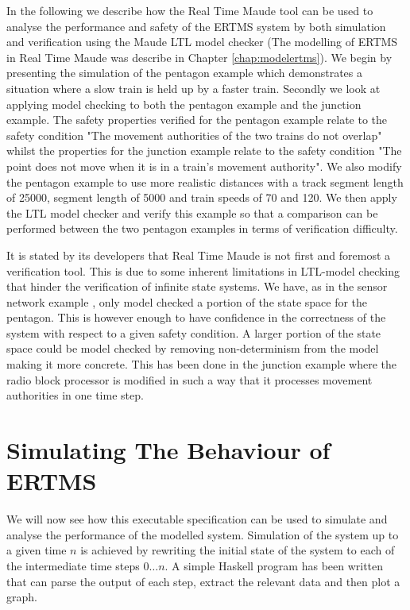 \label{chapter:verifyertms}\label{chap:verifyertms}


In the following we describe how the Real Time Maude tool can be used to analyse the performance and safety of the ERTMS system by both simulation and verification using the Maude LTL model checker (The modelling of ERTMS in Real Time Maude was describe in Chapter \ref{chap:modelertms}).  We begin by presenting the simulation of the pentagon example which demonstrates a situation where a slow train is held up by a faster train. Secondly we look at applying model checking to both the pentagon example and the junction example. The safety properties verified for the pentagon example relate to the safety condition "The movement authorities of the two trains do not overlap" whilst the properties for the junction example relate to the safety condition "The point does not move when it is in a train's movement authority". We also modify the pentagon example to use more realistic distances with a track segment length of 25000, segment length of 5000 and train speeds of 70 and 120.  We then apply the LTL model checker and verify this example so that a comparison can be performed between the two pentagon examples in terms of verification difficulty.

It is stated by its developers that Real Time Maude is not first and foremost a verification tool. This is due to some inherent limitations in LTL-model checking that hinder the verification of infinite state systems. We have, as in the sensor network example \cite{PO07}, only model checked a portion of the state space for the pentagon. This is however enough to have confidence in the correctness of the system with respect to a given safety condition. A larger portion of the state space could be model checked by removing non-determinism from the model making it more concrete. This has been done in the junction example where the radio block processor is modified in such a way that it processes movement authorities in one time step.


\section{Simulating The Behaviour of ERTMS}

We will now see how this executable specification can be used to simulate and analyse the performance of the modelled system. Simulation of the system up to a given time $n$ is achieved by rewriting the initial state of the system to each of the intermediate time steps $0 \ldots n$. A simple Haskell program has been written that can parse the output of each step, extract the relevant data and then plot a graph.

